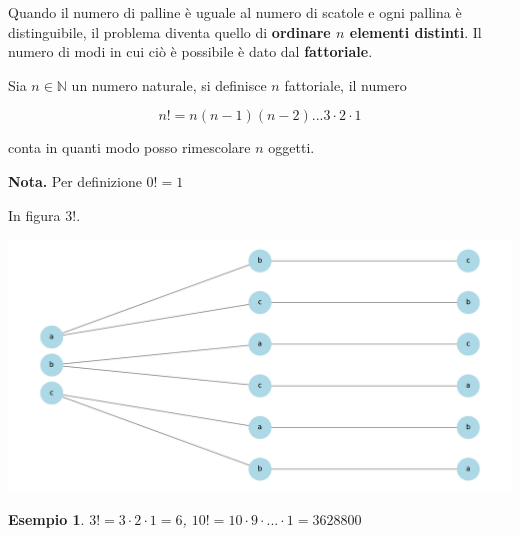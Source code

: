\documentclass[
  11pt,
]{book}
\theoremstyle{mytheoremstyle}
\theoremstyle{mydefstyle}
\newtheorem{example}{{Esempio}}[section]
\begin{document}
Quando il numero di palline è uguale al numero di scatole e ogni pallina è distinguibile, il problema diventa quello di \textbf{ordinare \(n\) elementi distinti}. Il numero di modi in cui ciò è possibile è dato dal \textbf{fattoriale}.

Sia \(n\in\mathbb{N}\) un numero naturale, si definisce \(n\) fattoriale, il numero

\[n!=n(n-1)(n-2)...3\cdot 2 \cdot 1\]

conta in quanti modo posso rimescolare \(n\) oggetti.

\textbf{Nota.} Per definizione \(0!=1\)

In figura \(3!\).

\begin{center}\includegraphics{Appunti_di_Statistica_2025_files/figure-latex/permutazioni-1} \end{center}

\begin{example}
\(3!=3\cdot 2\cdot 1=6\), \(10!=10\cdot 9\cdot... \cdot1 =3628800\)
\end{example}
\end{document}
